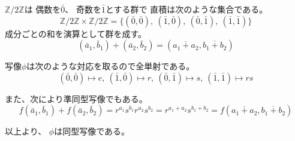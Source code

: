 \documentclass[12pt,b5paper]{ltjsarticle}
\begin{document}
\begin{enumerate}
      $\mathbb{Z}/2\mathbb{Z}$は
      偶数を$\bar{0}$、
      奇数を$\bar{1}$とする群で
      直積は次のような集合である。
      \begin{equation}
       \mathbb{Z}/2\mathbb{Z}\times\mathbb{Z}/2\mathbb{Z}
        =\{ (\bar{0},\bar{0}),\ (\bar{1},\bar{0}),\ (\bar{0},\bar{1}),\ (\bar{1},\bar{1})\}
      \end{equation}
      成分ごとの和を演算として群を成す。
      \begin{equation}
       (\bar{a}_1,\bar{b}_1) + (\bar{a}_2,\bar{b}_2)
        =(\overline{a_1+a_2},\overline{b_1+b_2})
      \end{equation}


      写像$\phi$は次のような対応を取るので全単射である。
      \begin{equation}
       (\bar{0},\bar{0}) \mapsto e,\
       (\bar{1},\bar{0}) \mapsto r,\
       (\bar{0},\bar{1}) \mapsto s,\
       (\bar{1},\bar{1}) \mapsto rs
      \end{equation}

      また、次により準同型写像でもある。
      \begin{equation}
       f(\bar{a}_1,\bar{b}_1)+f(\bar{a}_2,\bar{b}_2)
        =r^{a_1}s^{b_1}r^{a_2}s^{b_2}
        =r^{a_1+a_2}s^{b_1+b_2}
        =f(\overline{a_1+a_2},\overline{b_1+b_2})
      \end{equation}


      以上より、
      $\phi$は同型写像である。
      
\hrulefill
\end{enumerate}
\end{document}
